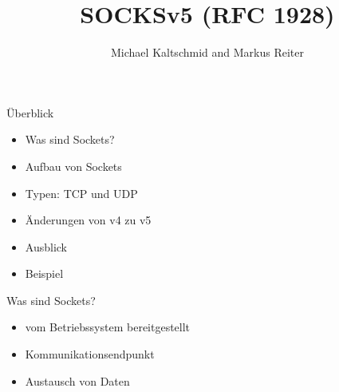 \documentclass[t]{beamer}
\title{SOCKSv5 (RFC 1928)}
\author{Michael Kaltschmid and Markus Reiter}
\date{\printdate{2017-06-13}}
\begin{document}
  \RaggedRight

  \maketitle

  \begin{frame}{Überblick}
    \begin{itemize}
      \item Was sind Sockets?
      \item Aufbau von Sockets
      \item Typen: TCP und UDP
      \item Änderungen von v4 zu v5
      \item Ausblick
      \item Beispiel
    \end{itemize}
  \end{frame}

  \begin{frame}{Was sind Sockets?}
    \begin{itemize}
      \item vom Betriebssystem bereitgestellt
      \item Kommunikationsendpunkt
      \item Austausch von Daten
    \end{itemize}
  \end{frame}
\end{document}
